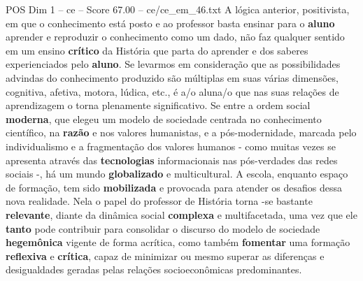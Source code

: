 \begin{textsample}{POS Dim 1 – ce – Score 67.00 – ce/ce\_em\_46.txt}
A lógica anterior, positivista, em que o conhecimento está posto e ao professor basta ensinar para o \textbf{aluno} aprender e reproduzir o conhecimento como um dado, não faz qualquer sentido em um ensino \textbf{crítico} da História que parta do aprender e dos saberes experienciados pelo \textbf{aluno}.
Se levarmos em consideração que as possibilidades advindas do conhecimento produzido são múltiplas em suas várias dimensões, cognitiva, afetiva, motora, lúdica, etc., é a/o aluna/o que nas suas relações de aprendizagem o torna plenamente significativo.
Se entre a ordem social \textbf{moderna}, que elegeu um modelo de sociedade centrada no conhecimento científico, na \textbf{razão} e nos valores humanistas, e a pós-modernidade, marcada pelo individualismo e a fragmentação dos valores humanos - como muitas vezes se apresenta através das \textbf{tecnologias} informacionais nas pós-verdades das redes sociais -, há um mundo \textbf{globalizado} e multicultural.
A escola, enquanto espaço de formação, tem sido \textbf{mobilizada} e provocada para atender os desafios dessa nova realidade.
Nela o papel do professor de História torna -se bastante \textbf{relevante}, diante da dinâmica social \textbf{complexa} e multifacetada, uma vez que ele \textbf{tanto} pode contribuir para consolidar o discurso do modelo de sociedade \textbf{hegemônica} vigente de forma acrítica, como também \textbf{fomentar} uma formação \textbf{reflexiva} e \textbf{crítica}, capaz de minimizar ou mesmo superar as diferenças e desigualdades geradas pelas relações socioeconômicas predominantes.

\end{textsample}
